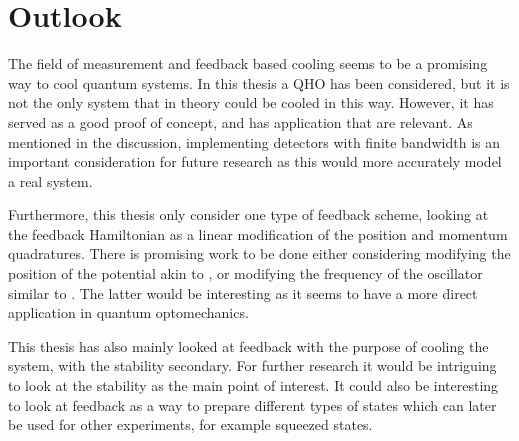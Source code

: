 \section{Outlook}
The field of measurement and feedback based cooling seems to be a promising way to cool quantum systems. In this thesis a QHO has been considered, but it is not the only system that in theory could be cooled in this way. However, it has served as a good proof of concept, and has application that are relevant. As mentioned in the discussion, implementing detectors with finite bandwidth is an important consideration for future research as this would more accurately model a real system. 

Furthermore, this thesis only consider one type of feedback scheme, looking at the feedback Hamiltonian as a linear modification of the position and momentum quadratures. There is promising work to be done either considering modifying the position of the potential akin to \cite{De-Sousa:2025}, or modifying the frequency of the oscillator similar to \cite{Habibi:2016}. The latter would be interesting as it seems to have a more direct application in quantum optomechanics.

This thesis has also mainly looked at feedback with the purpose of cooling the system, with the stability secondary. For further research it would be intriguing to look at the stability as the main point of interest. It could also be interesting to look at feedback as a way to prepare different types of states which can later be used for other experiments, for example squeezed states.
